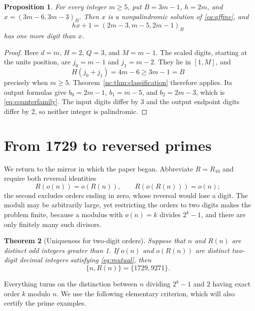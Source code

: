 \documentclass[11pt]{amsart}
\newtheorem{theorem}{Theorem}[section]
\newtheorem{proposition}[theorem]{Proposition}
\theoremstyle{remark}\newtheorem{remark}[theorem]{Remark}
\newcommand{\rev}{R}
\begin{document}
\begin{proposition}\label{prop:noncoprime}
For every integer $m\ge5$, put $B=3m-1$, $h=2m$, and $x=(3m-6,3m-3)_B$.
Then $x$ is a nonpalindromic solution of \eqref{eq:affine}, and
\begin{equation}\label{eq:counterfamily}
 hx+1=(2m-3,m-5,2m-1)_B
\end{equation}
has one more digit than $x$.
\end{proposition}
\begin{proof}
Here $d=m$, $H=2$, $Q=3$, and $M=m-1$. The scaled digits, starting at the units position, are $j_0=m-1$ and $j_1=m-2$. They lie in $[1,M]$, and
\[
 H(j_0+j_1)=4m-6\ge3m-1=B
\]
precisely when $m\ge5$. Theorem~\ref{nc:thm:classification} therefore applies. Its output formulas give $b_0=2m-1$, $b_1=m-5$, and $b_2=2m-3$, which is \eqref{eq:counterfamily}. The input digits differ by 3 and the output endpoint digits differ by 2, so neither integer is palindromic.
\end{proof}

\section{From 1729 to reversed primes}\label{sec:orders}\label{sec:classification}\label{sec:primes}

We return to the mirror in which the paper began. Abbreviate $R=R_{10}$ and require both reversal identities
\begin{equation}\label{eq:mutual}
 R(o(n))=o(R(n)),\qquad R(o(R(n)))=o(n);
\end{equation}
the second excludes orders ending in zero, whose reversal would lose a digit. The moduli may be arbitrarily large, yet restricting the orders to two digits makes the problem finite, because a modulus with $o(n)=k$ divides $2^k-1$, and there are only finitely many such divisors.

\begin{theorem}[Uniqueness for two-digit orders]\label{thm:classification}
Suppose that $n$ and $\rev(n)$ are distinct odd integers greater than 1.
If $o(n)$ and $o(\rev(n))$ are distinct two-digit decimal integers
satisfying \eqref{eq:mutual}, then
\[
 \{n,\rev(n)\}=\{1729,9271\}.
\]
\end{theorem}

Everything turns on the distinction between $n$ dividing $2^k-1$ and $2$ having exact order $k$ modulo $n$. We use the following elementary criterion, which will also certify the prime examples.
\end{document}
